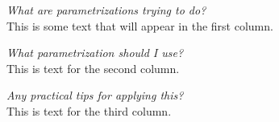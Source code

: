 \documentclass{article}
\begin{document}
\noindent
\begin{multicols}{3} %

    \noindent
    \textit{What are parametrizations trying to do?}\vspace{0.4em}\\
    This is some text that will appear in the first column.\\
    \columnbreak

    \noindent
    \textit{What parametrization should I use?}\vspace{0.4em}\\
    This is text for the second column.\\
    \columnbreak

    \noindent
    \textit{Any practical tips for applying this?}\vspace{0.4em}\\
    This is text for the third column.
    
    \end{multicols}
\end{document}
